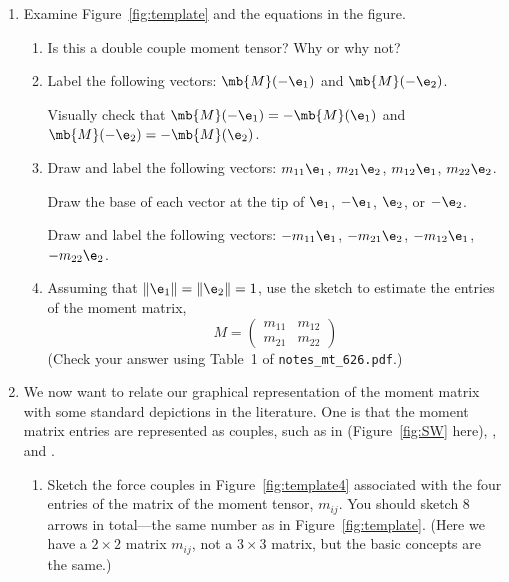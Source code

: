 \documentclass[11pt,titlepage,fleqn]{article}
\newcommand{\mtfile}{\texttt{notes\_mt\_626.pdf}}
\begin{document}
\begin{enumerate}
\item Examine Figure~\ref{fig:template} and the equations in the figure.

\begin{enumerate}
\item Is this a double couple moment tensor? Why or why not?

\item Label the following vectors: $\mb{M}(-\e_1)$ and $\mb{M}(-\e_2)$.

Visually check that $\mb{M}(-\e_1) = -\mb{M}(\e_1)$ and $\mb{M}(-\e_2) = -\mb{M}(\e_2)$.

\item Draw and label the following vectors: $m_{11}\e_1$, $m_{21}\e_2$, $m_{12}\e_1$, $m_{22}\e_2$.

Draw the base of each vector at the tip of $\e_1$, $-\e_1$, $\e_2$, or $-\e_2$.

Draw and label the following vectors: $-m_{11}\e_1$, $-m_{21}\e_2$, $-m_{12}\e_1$, $-m_{22}\e_2$.

\item Assuming that $\|\e_1\| = \|\e_2\| = 1$, use the sketch to estimate the entries of the moment matrix,
%
\begin{equation*}
M = \begin{pmatrix} m_{11} & m_{12} \\ m_{21} & m_{22} \end{pmatrix}
\end{equation*}
%
(Check your answer using Table~1 of \mtfile.)

\end{enumerate}

\item We now want to relate our graphical representation of the moment matrix with some standard depictions in the literature. One is that the moment matrix entries are represented as couples, such as in \citet[][Figure 4.4-4]{SteinWysession} (Figure~\ref{fig:SW} here), \citet[][Figure~9.2]{ShearerE2}, and \citet[][Figure 3.7]{AkiRichardsE2}.
%
\begin{enumerate}
\item Sketch the force couples in Figure~\ref{fig:template4} associated with the four entries of the matrix of the moment tensor, $m_{ij}$. You should sketch 8 arrows in total---the same number as in Figure~\ref{fig:template}.
(Here we have a $2 \times 2$ matrix $m_{ij}$, not a $3 \times 3$ matrix, but the basic concepts are the same.)


\end{enumerate}
\end{enumerate}
\end{document}
